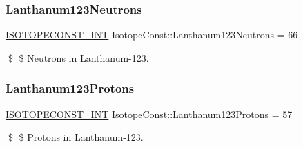 \subsubsection{\texorpdfstring{Lanthanum123\+Neutrons}{Lanthanum123Neutrons}}
{\footnotesize\ttfamily \mbox{\hyperlink{group___isotope_const-_macros_ga5f18360b3e99483a35c32d789e62621c}{I\+S\+O\+T\+O\+P\+E\+C\+O\+N\+S\+T\+\_\+\+I\+NT}} Isotope\+Const\+::\+Lanthanum123\+Neutrons = 66}

\$ \$ Neutrons in Lanthanum-\/123. \mbox{\label{group___isotope_const-_lanthanum-_la123_ga5748603213441888f0bad3e762694cc4}} 
\subsubsection{\texorpdfstring{Lanthanum123\+Protons}{Lanthanum123Protons}}
{\footnotesize\ttfamily \mbox{\hyperlink{group___isotope_const-_macros_ga5f18360b3e99483a35c32d789e62621c}{I\+S\+O\+T\+O\+P\+E\+C\+O\+N\+S\+T\+\_\+\+I\+NT}} Isotope\+Const\+::\+Lanthanum123\+Protons = 57}

\$ \$ Protons in Lanthanum-\/123. 